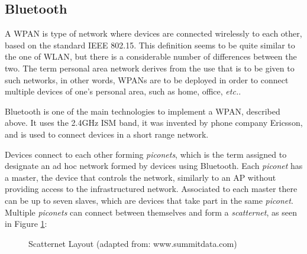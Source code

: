 \subsection{Bluetooth}
\label{subsection:bt}

A \gls{WPAN} is type of network where devices are connected wirelessly to each other, based on the standard IEEE 802.15. This definition seems to be quite similar to the one of \gls{WLAN}, but there is a considerable number of differences between the two. The term personal area network derives from the use that is to be given to such networks, in other words, \glspl{WPAN} are to be deployed in order to connect multiple devices of one's personal area, such as home, office, \textit{etc.}.

Bluetooth is one of the main technologies to implement a \gls{WPAN}, described above. It uses the 2.4GHz \gls{ISM} band, it was invented by phone company Ericsson, and is used to connect devices in a short range network.

Devices connect to each other forming \textit{piconets}, which is the term assigned to designate an ad hoc network formed by devices using Bluetooth. Each \textit{piconet} has a master, the device that controls the network, similarly to an \gls{AP} without providing access to the infrastructured network. Associated to each master there can be up to seven slaves, which are devices that take part in the same \textit{piconet}. Multiple \textit{piconets} can connect between themselves and form a \textit{scatternet}, as seen in Figure \ref{fig:bluetooth}:

\begin{figure}[ht]
	\noindent{}
	\caption{\label{fig:bluetooth} Scatternet Layout (adapted from: www.summitdata.com)}
\end{figure}

